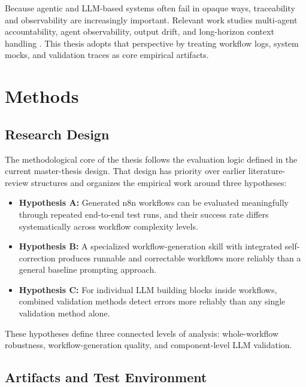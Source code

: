 \documentclass[12pt,a4paper]{article}
\begin{document}
Because agentic and LLM-based systems often fail in opaque ways, traceability and observability are increasingly important. Relevant work studies multi-agent accountability, agent observability, output drift, and long-horizon context handling \cite{barrak2025traceability_accountability_multiagent,dong2024agentops_observability,khatchadourian2025llm_output_drift,kang2025acon_context_compression,wu2025resum_context_summarization}. This thesis adopts that perspective by treating workflow logs, system mocks, and validation traces as core empirical artifacts.

\section{Methods}

\subsection{Research Design}

The methodological core of the thesis follows the evaluation logic defined in the current master-thesis design. That design has priority over earlier literature-review structures and organizes the empirical work around three hypotheses:

\begin{itemize}[leftmargin=*]
  \item \textbf{Hypothesis A:} Generated n8n workflows can be evaluated meaningfully through repeated end-to-end test runs, and their success rate differs systematically across workflow complexity levels.
  \item \textbf{Hypothesis B:} A specialized workflow-generation skill with integrated self-correction produces runnable and correctable workflows more reliably than a general baseline prompting approach.
  \item \textbf{Hypothesis C:} For individual LLM building blocks inside workflows, combined validation methods detect errors more reliably than any single validation method alone.
\end{itemize}

These hypotheses define three connected levels of analysis: whole-workflow robustness, workflow-generation quality, and component-level LLM validation.

\subsection{Artifacts and Test Environment}
\end{document}
